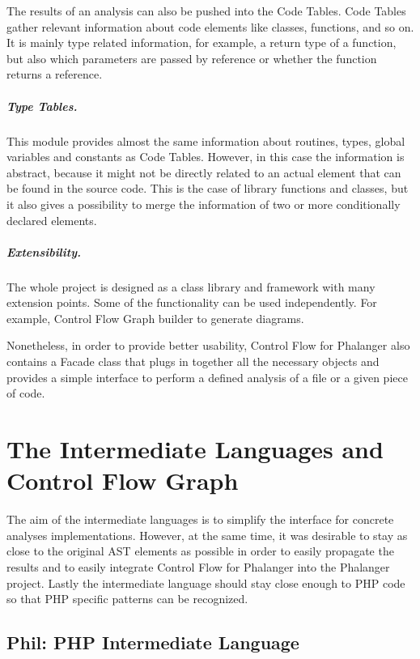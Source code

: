     The results of an analysis can also be pushed into 
    the Code Tables. Code Tables gather relevant information 
    about code elements like classes, functions, and so on. 
    It is mainly type related information, 
    for example, a return type of a function, 
    but also which parameters are passed by reference or 
    whether the function returns a reference.
    
    \subparagraph*{Type Tables.} This module provides 
    almost the same information about routines, types, 
    global variables and constants as Code Tables. 
    However, in this case the information 
    is abstract, because it might not be directly related 
    to an actual element that can be found in the source code. 
    This is the case of library functions and classes, 
    but it also gives a possibility to merge the information 
    of two or more conditionally declared elements. 
    
    \subparagraph*{Extensibility.}
    The whole project is designed as a class library and 
    framework with many extension points. Some of the 
    functionality can be used independently. For example, 
    Control Flow Graph builder to generate diagrams.
    
    Nonetheless, in order to provide better usability, 
    Control Flow for Phalanger also contains 
    a Facade class  
    that plugs in together all the necessary objects 
    and provides a simple interface to perform a defined 
    analysis of a file or a given piece of code.
    
    \section{The Intermediate Languages and Control Flow Graph}
        The aim of the intermediate languages is to simplify the 
        interface for concrete analyses implementations. 
        However, at the same time, it was desirable to stay as 
        close to the original AST elements as possible in order 
        to easily propagate the results and to easily integrate 
        Control Flow for Phalanger into the Phalanger project.         
        Lastly the intermediate language should stay close enough 
        to PHP code so that PHP specific patterns can be recognized.
        
        \subsection{Phil: PHP Intermediate Language}
        
